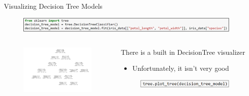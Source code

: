\documentclass[aspectratio=169]{../latex_main/tntbeamer}  %
\begin{document}
	
	\begin{frame}{Visualizing Decision Tree Models }
	    \begin{figure}
	        \centering
	        \includegraphics[scale=.6]{Bild17}
	    \end{figure}
	    \begin{columns}
	        \begin{column}{.5\textwidth}
	                \begin{figure}
	                    \includegraphics[scale=.55]{Bild22}
	                \end{figure}
	        \end{column}
	        
	        
	        \begin{column}{.5\textwidth}
	                There is a built in DecisionTree visualizer
	                \begin{itemize}
	                    \item Unfortunately, it isn’t very good
	                \end{itemize}
	                \begin{figure}
	                    \includegraphics[scale=.65]{Bild21}
	                \end{figure}
	        \end{column}
	    \end{columns}
	\end{frame}
	
\end{document}

